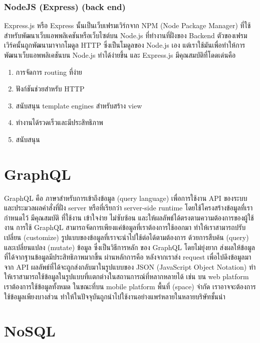 \subsubsection{NodeJS (Express) (back end)}

Express.js หรือ Express นั้นเป็นเว็บเฟรมเวิร์กจาก NPM (Node Package Manager) ที่ใช้สำหรับพัฒนาเว็บแอพพลิเคชันหรือเว็บไซต์บน Node.js ที่ทำงานที่ฝั่งของ Backend ตัวของเฟรมเวิร์คนั้นถูกพัฒนามาจากโมดูล HTTP ซึ่งเป็นโมดูลของ Node.js เอง แต่เราใช้มันเพื่อทำให้การพัฒนาเว็บแอพพลิเคชันบน Node.js ทำได้ง่ายขึ้น และ Express.js มีคุณสมบัติที่โดดเด่นคือ

\begin{enumerate}
  \item การจัดการ routing ที่ง่าย
	\item ฟังก์ชันช่วยสำหรับ HTTP
	\item สนับสนุน template engines สำหรับสร้าง view
	\item ทำงานได้รวดเร็วและมีประสิทธิภาพ
	\item สนับสนุน 
\end{enumerate}



\section{GraphQL}

GraphQL คือ ภาษาสำหรับการเข้าถึงข้อมูล (query language) เพื่อการใช้งาน API ของระบบและประมวลผลคำสั่งที่ฝั่ง server หรือที่เรียกว่า server-side runtime โดยใช้โครงสร้างข้อมูลที่เรากำหนดไว้ มีคุณสมบัติ ที่ใช้งาน เข้าใจง่าย ไม่ซับซ้อน และให้ผลลัพธ์ได้ตรงตามความต้องการของผู้ใช้งาน การใช้ GraphQL สามารถจัดการเพียงแค่ข้อมูลที่เราต้องการใช้ออกมา ทำให้เราสามารถปรับเปลี่ยน (customize) รูปแบบของข้อมูลที่เราจะนำไปใช้ต่อได้ตามต้องการ ด้วยการสืบค้น (query) และเปลี่ยนแปลง (mutate) ข้อมูล ซึ่งเป็นวิธีการหลัก ของ GraphQL โดยไม่ยุ่งยาก ส่งผลให้ข้อมูลที่ได้จากฐานข้อมูลมีประสิทธิภาพมากขึ้น ผ่านหลักการคือ หลังจากเราส่ง request เพื่อไปดึงข้อมูลมาจาก API ผลลัพธ์ที่ได้จะถูกส่งกลับมาในรูปแบบของ JSON (JavaScript Object Notation) ทําให้เราสามารถใช้ข้อมูลในรูปแบบที่เเตกต่างในสถานการณ์ที่หลากหลายได้ เช่น บน web platform เราต้องการใช้ข้อมูลทั้งหมด ในขณะที่บน mobile platform พื้นที่ (space) จำกัด เราอาจจะต้องการใช้ข้อมูลเพียงบางส่วน ทําให้ในปัจจุบันถูกนำไปใช้งานอย่างแพร่หลายในหลายบริษัทชั้นนํา

\section{NoSQL}

